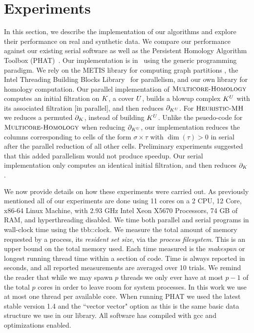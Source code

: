 \documentclass{elsarticle}
\begin{document}
\section{Experiments}

\label{sec:exp}
In this section, we describe the implementation of our algorithms
and explore their performance on real and synthetic data. We compare our
performance against our existing serial software as well as the Persistent Homology Algorithm Toolbox (PHAT)~\cite{bkr-cccph-13}. 
Our implementation is in \cplusplus\, using the generic programming paradigm. 
We rely on the METIS library for computing graph partitions 
\cite{KaKu95}, the Intel Threading Building Blocks 
Library~\cite{IntelTBB} for parallelism, and our own
library for homology computation. Our parallel implementation of $\textnormal{\scshape Multicore-Homology}$ computes
an initial filtration on $K$, a cover $U$, builds a blowup complex $K^{U}$ 
with its associated filtration [in parallel], and then reduces $\partial_{K^{U}}$.
For $\textnormal{\scshape Heuristic-MH}$ we reduces a permuted $\partial_K$, instead of building $K^{U}$.
Unlike the psuedo-code for $\textnormal{\scshape Multicore-Homology}$ when reducing $\partial_{K^{U}}$,
our implementation reduces the columns corresponding to cells of the form $\sigma \times \tau$ with $\dim{(\tau)} > 0$ in serial
after the parallel reduction of all other cells. Preliminary experiments suggested that
this added parallelism would not produce speedup. Our serial implementation only 
computes an identical initial filtration, and then reduces $\partial_K$.

We now provide details on how these experiments were carried out.
As previously mentioned all of our experiments are done 
using 11 cores on a 2 CPU, 12 Core, x86-64 Linux Machine, with 2.93 GHz Intel 
Xeon X5670 Processors, 74 GB of RAM, and hyperthreading disabled.
We time both parallel and serial programs in wall-clock time using the tbb::clock. 
We measure the total amount of memory requested by a process, its \emph{resident set size},
via the \emph{process filesystem}. This is an upper bound on the total memory used.  
Each time measured is the \emph{makespan} or longest running thread time within a section of code. 
Time is always reported in seconds, and all reported measurements are averaged over 10 trials.
We remind the reader that while we may spawn $p$ threads we only ever have at most $p-1$ of the total $p$ cores 
in order to leave room for system processes. In this work we use at most one thread per available 
core. When running PHAT we used the latest stable version 1.4 and the ``vector vector" option as 
this is the same basic data structure we use in our library. All software has compiled with gcc and optimizations
enabled.
\end{document}
